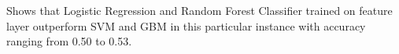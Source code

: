 Shows that Logistic Regression and Random Forest Classifier trained on feature layer outperform SVM and GBM in this particular instance with accuracy ranging from 0.50 to 0.53.